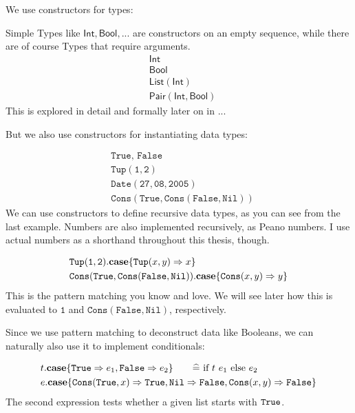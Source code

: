 \documentclass[twoside,12pt,a4paper]{article}
\begin{document}
We use constructors for types:
\begin{example}
    Simple Types like $\mathsf{Int, Bool, ...}$ are constructors on an empty sequence, 
    while there are of course Types that require arguments. %
    \begin{align*}
        &\mathsf{Int}\\
        &\mathsf{Bool}\\
        &\mathsf{List(Int)}\\
        &\mathsf{Pair(Int, Bool)}
    \end{align*}
    This is explored in detail and formally later on in ... %
\end{example}

But we also use constructors for instantiating data types:
\begin{example}
    \begin{align*}
        &\texttt{True, False}\\
        &\mathtt{Tup(1,2)}\\
        &\mathtt{Date(27, 08, 2005)}\\
        &\mathtt{Cons(True, Cons(False, Nil))}              
    \end{align*}
    We can use constructors to define recursive data types, as you can see from the last example.
    Numbers are also implemented recursively, as Peano numbers. I use actual numbers as a shorthand throughout this thesis, though.
\end{example}

\begin{example}
    \begin{align*}
        &\mathtt{Tup(1,2)}.\textbf{case}\{\mathtt{Tup(}x, y\mathtt{)}\Rightarrow x\}\\
        &\mathtt{Cons(True, Cons(False, Nil))}.\textbf{case}\{\mathtt{Cons(}x, y\mathtt{)}\Rightarrow y\}   
    \end{align*}
    This is the pattern matching you know and love. 
    We will see later how this is evaluated to $\mathtt{1}$ and $\mathtt{Cons(False, Nil)}$, respectively.
\end{example}

Since we use pattern matching to deconstruct data like Booleans, we can naturally also use it to implement conditionals:
\begin{example}
    \begin{align*}
        &t.\expatmatch{\True\Rightarrow e_1, \False\Rightarrow e_2} \tag*{$\widehat{=}$ if $t$ $e_1$ else $e_2$}\\
        &e.\expatmatch{\mathttbrackets{Cons}{\True, x}\Rightarrow \True, 
        \mathtt{Nil\Rightarrow False}, \mathttbrackets{Cons}{x, y}\Rightarrow\False}
    \end{align*}
The second expression tests whether a given list starts with $\mathtt{True}$.
\end{example}
\end{document}
